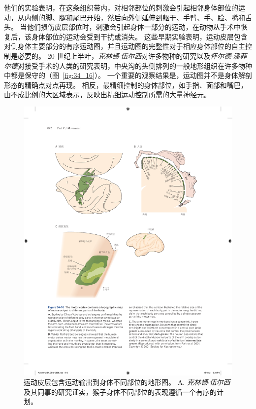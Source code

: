 他们的实验表明，在这条组织带内，对相邻部位的刺激会引起相邻身体部位的运动，从内侧的脚、腿和尾巴开始，然后向外侧延伸到躯干、手臂、手、脸、嘴和舌头。
当他们损伤皮层部位时，刺激会引起身体一部分的运动，在动物从手术中恢复后，该身体部位的运动会受到干扰或消失。
这些早期实验表明，运动皮层包含对侧身体主要部分的有序运动图，并且运动图的完整性对于相应身体部位的自主控制是必要的。
20 世纪上半叶，\textit{克林顿$\cdot$伍尔西}对许多物种的研究以及\textit{怀尔德$\cdot$潘菲尔德}对接受手术的人类的研究表明，中央沟的头侧排列的一般地形组织在许多物种中都是保守的（图~\ref{fig:34_16}）。
一个重要的观察结果是，运动图并不是身体解剖形态的精确点对点再现。
相反，最精细控制的身体部位，如手指、面部和嘴巴，由不成比例的大区域表示，反映出精细运动控制所需的大量神经元。


\begin{figure}[htbp]
	\centering
	\includegraphics[width=1.0\linewidth]{chap34/fig_34_16}
	\caption{运动皮层包含运动输出到身体不同部位的地形图。
		A. \textit{克林顿$\cdot$伍尔西}及其同事的研究证实，猴子身体不同部位的表现遵循一个有序的计划。
}
\end{figure}
